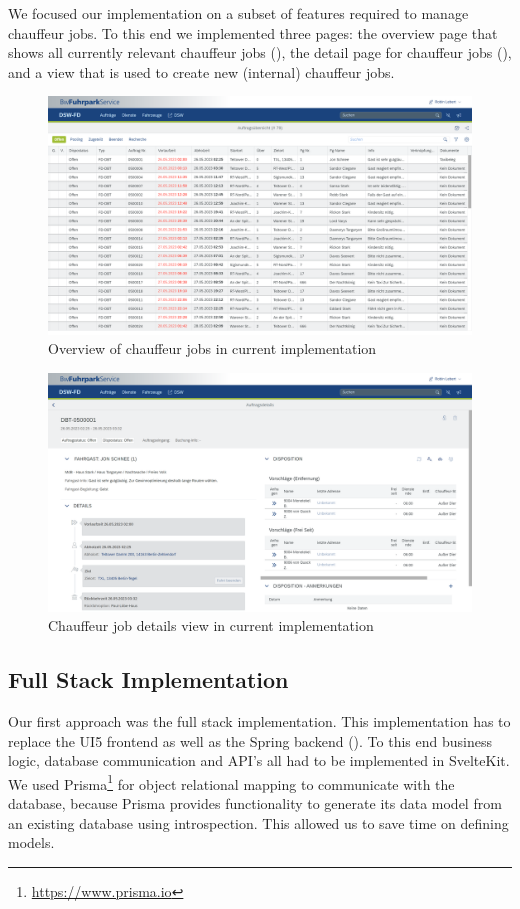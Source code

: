 We focused our implementation on a subset of features required to manage chauffeur jobs. To this end we implemented three pages: the overview page that shows all currently relevant chauffeur jobs (), the detail page for chauffeur jobs (), and a view that is used to create new (internal) chauffeur jobs.

\begin{figure}
    \centering
    \includegraphics[width=\linewidth]{assets/current-auftrag-overview}
    \caption{Overview of chauffeur jobs in current implementation}
    \label{fig:current-overview-auftrag}
\end{figure}

\begin{figure}
    \centering
    \includegraphics[width=\linewidth]{assets/current-auftrag-details}
    \caption{Chauffeur job details view in current implementation}
    \label{fig:current-details-auftrag}
\end{figure}


\subsection{Full Stack Implementation}
Our first approach was the full stack implementation. This implementation has to replace the UI5 frontend as well as the Spring backend (). To this end business logic, database communication and API's all had to be implemented in SvelteKit. We used Prisma\footnote{\url{https://www.prisma.io}} for object relational mapping to communicate with the database, because Prisma provides functionality to generate its data model from an existing database using introspection. This allowed us to save time on defining models. 


